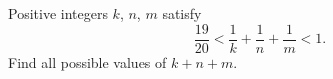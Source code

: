 Positive integers $k$, $n$, $m$ satisfy
\[
\dfrac{19}{20}<\dfrac{1}{k}+\dfrac{1}{n}+\dfrac{1}{m}<1 .
\]
Find all possible values of $k+n+m$.
